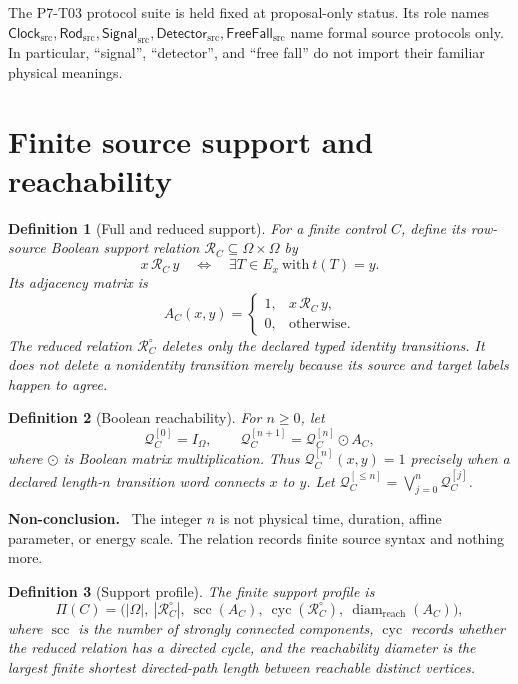 \documentclass[11pt]{article}
\newtheorem{definition}{Definition}
\newenvironment{nonconclusion}{\par\smallskip\noindent\textbf{Non-conclusion.}\ }{\par\smallskip}
\newcommand{\Src}{\mathrm{src}}
\newcommand{\Rel}{\mathcal R}
\newcommand{\Reach}{\mathcal Q}
\newcommand{\Clock}{\mathsf{Clock}_{\Src}}
\newcommand{\Rod}{\mathsf{Rod}_{\Src}}
\newcommand{\Signal}{\mathsf{Signal}_{\Src}}
\newcommand{\Detector}{\mathsf{Detector}_{\Src}}
\newcommand{\FreeFall}{\mathsf{FreeFall}_{\Src}}
\begin{document}
The P7-T03 protocol suite is held fixed at proposal-only status.  Its role
names \(\Clock,\Rod,\Signal,\Detector,\FreeFall\) name formal source
protocols only.  In particular, ``signal'', ``detector'', and ``free fall''
do not import their familiar physical meanings.

\section{Finite source support and reachability}

\begin{definition}[Full and reduced support]
For a finite control \(C\), define its row-source Boolean support relation
\(\Rel_C\subseteq\Omega\times\Omega\) by
\[
  x\,\Rel_C\,y
  \quad\Longleftrightarrow\quad
  \exists T\in E_x\ \text{with}\ t(T)=y.
\]
Its adjacency matrix is
\[
  A_C(x,y)=
  \begin{cases}
  1,&x\,\Rel_C\,y,\\
  0,&\text{otherwise}.
  \end{cases}
\]
The reduced relation \(\Rel_C^\circ\) deletes only the declared typed
identity transitions.  It does not delete a nonidentity transition merely
because its source and target labels happen to agree.
\end{definition}

\begin{definition}[Boolean reachability]
For \(n\geq 0\), let
\[
  \Reach_C^{[0]}=I_\Omega,\qquad
  \Reach_C^{[n+1]}=\Reach_C^{[n]}\odot A_C,
\]
where \(\odot\) is Boolean matrix multiplication.  Thus
\(\Reach_C^{[n]}(x,y)=1\) precisely when a declared length-\(n\) transition
word connects \(x\) to \(y\).  Let
\(\Reach_C^{[\le n]}=\bigvee_{j=0}^{n}\Reach_C^{[j]}\).
\end{definition}

\begin{nonconclusion}
The integer \(n\) is not physical time, duration, affine parameter, or
energy scale.  The relation records finite source syntax and nothing more.
\end{nonconclusion}

\begin{definition}[Support profile]
The finite support profile is
\[
  \Pi(C)=
  \bigl(
  |\Omega|,\ |\Rel_C^\circ|,\ \operatorname{scc}(A_C),\
  \operatorname{cyc}(\Rel_C^\circ),\
  \operatorname{diam}_{\mathrm{reach}}(A_C)
  \bigr),
\]
where \(\operatorname{scc}\) is the number of strongly connected
components, \(\operatorname{cyc}\) records whether the reduced relation has
a directed cycle, and the reachability diameter is the largest finite
shortest directed-path length between reachable distinct vertices.
\end{definition}
\end{document}
